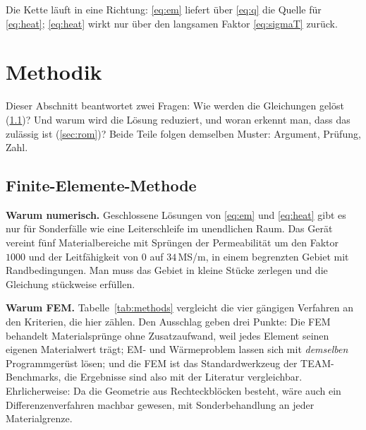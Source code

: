 \documentclass[a4paper, 10pt, conference]{ieeeconf}
\theoremstyle{remark}
\begin{document}
Die Kette läuft in eine Richtung: \eqref{eq:em} liefert über \eqref{eq:q}
die Quelle für \eqref{eq:heat}; \eqref{eq:heat} wirkt nur über den langsamen
Faktor \eqref{eq:sigmaT} zurück.

\section{Methodik}
\label{sec:method}

Dieser Abschnitt beantwortet zwei Fragen: Wie werden die Gleichungen
gelöst (\ref{sec:fem})? Und warum wird die Lösung reduziert, und woran
erkennt man, dass das zulässig ist (\ref{sec:rom})? Beide Teile folgen
demselben Muster: Argument, Prüfung, Zahl.

\subsection{Finite-Elemente-Methode}
\label{sec:fem}

\textbf{Warum numerisch.} Geschlossene Lösungen von \eqref{eq:em} und
\eqref{eq:heat} gibt es nur für Sonderfälle wie eine Leiterschleife im
unendlichen Raum. Das Gerät vereint fünf Materialbereiche mit Sprüngen der
Permeabilität um den Faktor $1000$ und der Leitfähigkeit von $0$ auf
$34\,$MS/m, in einem begrenzten Gebiet mit Randbedingungen. Man muss das
Gebiet in kleine Stücke zerlegen und die Gleichung stückweise erfüllen.

\textbf{Warum FEM.} Tabelle~\ref{tab:methods} vergleicht die vier gängigen
Verfahren an den Kriterien, die hier zählen. Den Ausschlag geben drei
Punkte: Die FEM behandelt Materialsprünge ohne Zusatzaufwand, weil jedes
Element seinen eigenen Materialwert trägt; EM- und Wärmeproblem lassen sich
mit \emph{demselben} Programmgerüst lösen; und die FEM ist das
Standardwerkzeug der TEAM-Benchmarks, die Ergebnisse sind also mit der
Literatur vergleichbar. Ehrlicherweise: Da die Geometrie aus
Rechteckblöcken besteht, wäre auch ein Differenzenverfahren machbar
gewesen, mit Sonderbehandlung an jeder Materialgrenze.
\end{document}
